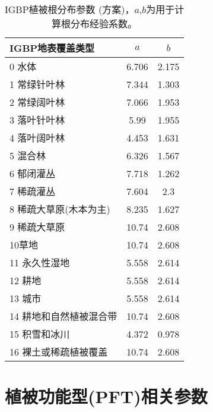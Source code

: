 \begin{table}[]
\centering
\caption{IGBP植被根分布参数 (\citet{zeng2001global}方案)，$a$,$b$为用于计算根分布经验系数。}
\label{tab:IGBP植被根分布参数zeng方案}
\begin{tabular}{@{}lcc@{}}
\toprule
IGBP地表覆盖类型     & $a$ & $b$ \\ \midrule
0 水体            & 6.706           & 2.175 \\ \midrule
1 常绿针叶林       & 7.344          & 1.303          \\
2 常绿阔叶林       & 7.066          & 1.953          \\
3 落叶针叶林       & 5.99           & 1.955          \\
4 落叶阔叶林       & 4.453          & 1.631          \\
5 混合林         & 6.326          & 1.567          \\
6 郁闭灌丛        & 7.718          & 1.262          \\
7 稀疏灌丛        & 7.604          & 2.3            \\
8 稀疏大草原(木本为主) & 8.235          & 1.627          \\
9 稀疏大草原       & 10.74          & 2.608          \\
10草地          & 10.74          & 2.608          \\
11 永久性湿地      & 5.558          & 2.614          \\
12 耕地         & 5.558          & 2.614          \\
13 城市         & 5.558          & 2.614          \\
14 耕地和自然植被混合带 & 10.74          & 2.608          \\
15 积雪和冰川      & 4.372          & 0.978          \\
16 裸土或稀疏植被覆盖  & 10.74          & 2.608          \\ \bottomrule
\end{tabular}
\end{table}

\chapter{植被功能型(PFT)相关参数}\label{植被功能型PFT相关参数}

